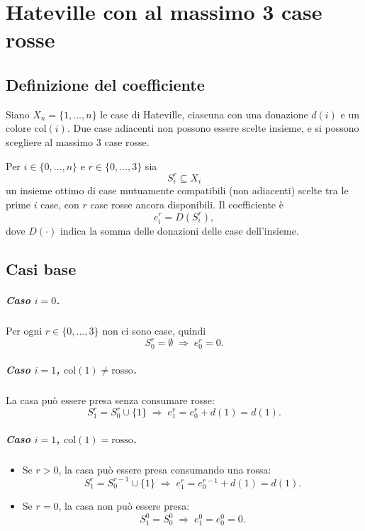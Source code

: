 
\chapter{Hateville con al massimo 3 case rosse}

\newcommand{\col}{\mathrm{col}}
\newcommand{\rosso}{\mathrm{rosso}}
\newcommand{\HVBU}{\textsc{HVBU}}
\newcommand{\HVR}{\textsc{HVR}}

\section{Definizione del coefficiente}

Siano $X_n = \{1,\dots,n\}$ le case di Hateville, ciascuna con una donazione
$d(i)$ e un colore $\col(i)$. Due case adiacenti non possono essere scelte
insieme, e si possono scegliere al massimo $3$ case rosse.

Per $i \in \{0,\dots,n\}$ e $r \in \{0,\dots,3\}$ sia
\[
  S_i^r \subseteq X_i
\]
un insieme ottimo di case mutuamente compatibili (non adiacenti) scelte tra le
prime $i$ case, con $r$ case rosse ancora disponibili. Il coefficiente è
\[
  e_i^r = D(S_i^r),
\]
dove $D(\cdot)$ indica la somma delle donazioni delle case dell'insieme.

\section{Casi base}

\paragraph{Caso $i = 0$.} Per ogni $r \in \{0,\dots,3\}$ non ci sono case, quindi
\[
  S_0^r = \emptyset \;\Longrightarrow\; e_0^r = 0.
\]

\paragraph{Caso $i = 1$, $\col(1) \neq \rosso$.} La casa può essere presa senza
consumare rosse:
\[
  S_1^r = S_0^r \cup \{1\} \;\Longrightarrow\; e_1^r = e_0^r + d(1) = d(1).
\]

\paragraph{Caso $i = 1$, $\col(1) = \rosso$.}
\begin{itemize}
  \item Se $r > 0$, la casa può essere presa consumando una rossa:
  \[
    S_1^r = S_0^{r-1} \cup \{1\} \;\Longrightarrow\; e_1^r = e_0^{r-1} + d(1) = d(1).
  \]
  \item Se $r = 0$, la casa non può essere presa:
  \[
    S_1^0 = S_0^0 \;\Longrightarrow\; e_1^0 = e_0^0 = 0.
  \]
\end{itemize}

